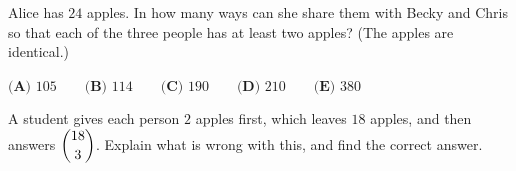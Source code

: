 Alice has $24$ apples. In how many ways can she share them with Becky and Chris so that each of the three people has at least two apples? (The apples are identical.)

$\textbf{(A) }105\qquad\textbf{(B) }114\qquad\textbf{(C) }190\qquad\textbf{(D) }210\qquad\textbf{(E) }380$

A student gives each person $2$ apples first, which leaves $18$ apples, and then answers $\dbinom{18}{3}$. Explain what is wrong with this, and find the correct answer.
